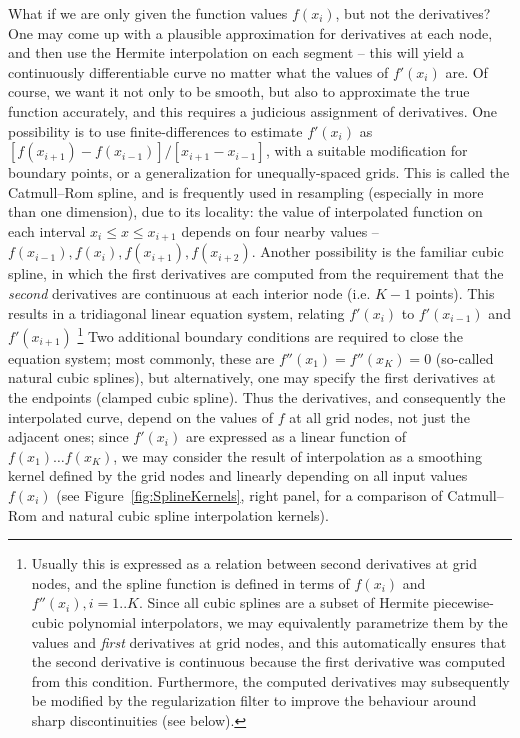 \documentclass[12pt]{article}
\begin{document}
What if we are only given the function values $f(x_i)$, but not the derivatives? One may come up with a plausible approximation for derivatives at each node, and then use the Hermite interpolation on each segment -- this will yield a continuously differentiable curve no matter what the values of $f'(x_i)$ are. Of course, we want it not only to be smooth, but also to approximate the true function accurately, and this requires a judicious assignment of derivatives. One possibility is to use finite-differences to estimate $f'(x_i)$ as $[f(x_{i+1})-f(x_{i-1})]/[x_{i+1}-x_{i-1}]$, with a suitable modification for boundary points, or a generalization for unequally-spaced grids. This is called the Catmull--Rom spline, and is frequently used in resampling (especially in more than one dimension), due to its locality: the value of interpolated function on each interval $x_i\le x\le x_{i+1}$ depends on four nearby values -- $f(x_{i-1}), f(x_i), f(x_{i+1}), f(x_{i+2})$.
Another possibility is the familiar cubic spline, in which the first derivatives are computed from the requirement that the \textit{second} derivatives are continuous at each interior node (i.e. $K-1$ points). This results in a tridiagonal linear equation system, relating $f'(x_i)$ to $f'(x_{i-1})$ and $f'(x_{i+1})$%
\footnote{Usually this is expressed as a relation between second derivatives at grid nodes, and the spline function is defined in terms of $f(x_i)$ and $f''(x_i), i=1..K$. Since all cubic splines are a subset of Hermite piecewise-cubic polynomial interpolators, we may equivalently parametrize them by the values and \textit{first} derivatives at grid nodes, and this automatically ensures that the second derivative is continuous because the first derivative was computed from this condition. Furthermore, the computed derivatives may subsequently be modified by the regularization filter to improve the behaviour around sharp discontinuities (see below). }
Two additional boundary conditions are required to close the equation system; most commonly, these are $f''(x_1) = f''(x_K) = 0$ (so-called natural cubic splines), but alternatively, one may specify the first derivatives at the endpoints (clamped cubic spline). Thus the derivatives, and consequently the interpolated curve, depend on the values of $f$ at all grid nodes, not just the adjacent ones; since $f'(x_i)$ are expressed as a linear function of $f(x_1)\dots f(x_K)$, we may consider the result of interpolation as a smoothing kernel defined by the grid nodes and linearly depending on all input values $f(x_i)$ (see Figure~\ref{fig:SplineKernels}, right panel, for a comparison of Catmull--Rom and natural cubic spline interpolation kernels).
\end{document}
